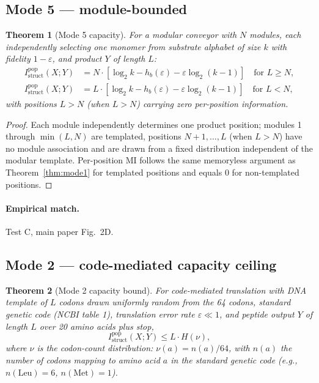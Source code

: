 \documentclass[11pt]{article}
\theoremstyle{plain}
\newtheorem{theorem}{Theorem}
\theoremstyle{definition}
\newcommand{\Istructpop}{I_{\mathrm{struct}}^{\mathrm{pop}}}
\newcommand{\Hbin}{h_b}
\begin{document}
\subsection{Mode 5 --- module-bounded}

\begin{theorem}[Mode 5 capacity]
\label{thm:mode5}
For a modular conveyor with $N$ modules, each independently selecting one monomer from substrate alphabet of size $k$ with fidelity $1 - \varepsilon$, and product $Y$ of length $L$:
\begin{align*}
\Istructpop(X; Y) &= N \cdot \left[\log_2 k - \Hbin(\varepsilon) - \varepsilon \log_2 (k - 1)\right] \quad \text{for } L \ge N, \\
\Istructpop(X; Y) &= L \cdot \left[\log_2 k - \Hbin(\varepsilon) - \varepsilon \log_2 (k - 1)\right] \quad \text{for } L < N,
\end{align*}
with positions $L > N$ (when $L > N$) carrying zero per-position information.
\end{theorem}

\begin{proof}
Each module independently determines one product position; modules 1 through $\min(L, N)$ are templated, positions $N+1, \ldots, L$ (when $L > N$) have no module association and are drawn from a fixed distribution independent of the modular template. Per-position MI follows the same memoryless argument as Theorem~\ref{thm:mode1} for templated positions and equals 0 for non-templated positions.
\end{proof}

\paragraph{Empirical match.} Test C, main paper Fig.~2D.

\subsection{Mode 2 --- code-mediated capacity ceiling}

\begin{theorem}[Mode 2 capacity bound]
\label{thm:mode2}
For code-mediated translation with DNA template of $L$ codons drawn uniformly random from the 64 codons, standard genetic code (NCBI table 1), translation error rate $\varepsilon \ll 1$, and peptide output $Y$ of length $L$ over 20 amino acids plus stop,
\[
\Istructpop(X; Y) \le L \cdot H(\nu),
\]
where $\nu$ is the codon-count distribution: $\nu(a) = n(a)/64$, with $n(a)$ the number of codons mapping to amino acid $a$ in the standard genetic code (e.g., $n(\mathrm{Leu}) = 6$, $n(\mathrm{Met}) = 1$).
\end{theorem}
\end{document}

